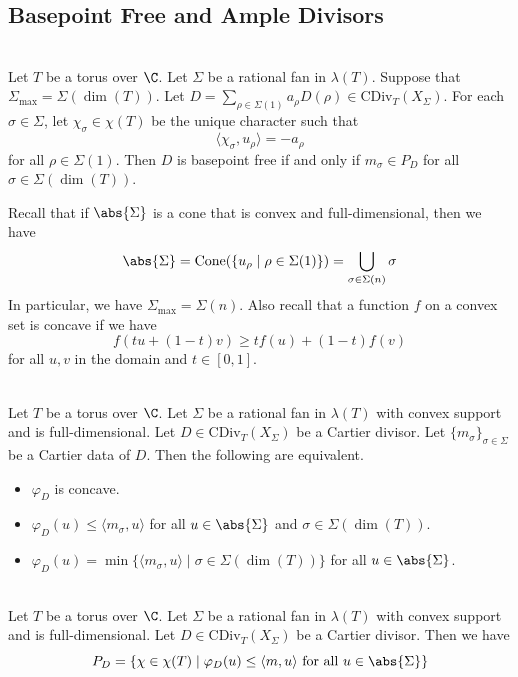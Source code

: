\documentclass[a4paper]{article}
\begin{document}
\subsection{Basepoint Free and Ample Divisors}
\begin{prp}{}{}\\
Let $T$ be a torus over $\C$. Let $\Sigma$ be a rational fan in $\lambda(T)$. Suppose that $\Sigma_\text{max}=\Sigma(\dim(T))$. Let $D=\sum_{\rho\in\Sigma(1)}a_\rho D(\rho)\in\text{CDiv}_T(X_\Sigma)$. For each $\sigma\in\Sigma$, let $\chi_\sigma\in\chi(T)$ be the unique character such that $$\langle\chi_\sigma,u_\rho\rangle=-a_\rho$$ for all $\rho\in\Sigma(1)$. Then $D$ is basepoint free if and only if $m_\sigma\in P_D$ for all $\sigma\in\Sigma(\dim(T))$. 
\end{prp}

Recall that if $\abs{\Sigma}$ is a cone that is convex and full-dimensional, then we have $$\abs{\Sigma}=\text{Cone}(\{u_\rho\;|\;\rho\in\Sigma(1)\})=\bigcup_{\sigma\in\Sigma(n)}\sigma$$ In particular, we have $\Sigma_\text{max}=\Sigma(n)$. Also recall that a function $f$ on a convex set is concave if we have $$f(tu+(1-t)v)\geq tf(u)+(1-t)f(v)$$ for all $u,v$ in the domain and $t\in[0,1]$. 

\begin{lmm}{}{}\\
Let $T$ be a torus over $\C$. Let $\Sigma$ be a rational fan in $\lambda(T)$ with convex support and is full-dimensional. Let $D\in\text{CDiv}_T(X_\Sigma)$ be a Cartier divisor. Let $\{m_\sigma\}_{\sigma\in\Sigma}$ be a Cartier data of $D$. Then the following are equivalent. 
\begin{itemize}
\item $\varphi_D$ is concave. 
\item $\varphi_D(u)\leq\langle m_\sigma,u\rangle$ for all $u\in\abs{\Sigma}$ and $\sigma\in\Sigma(\dim(T))$. 
\item $\varphi_D(u)=\min\{\langle m_\sigma,u\rangle\;|\;\sigma\in\Sigma(\dim(T))\}$ for all $u\in\abs{\Sigma}$. 
\end{itemize}
\end{lmm}

\begin{lmm}{}{}\\
Let $T$ be a torus over $\C$. Let $\Sigma$ be a rational fan in $\lambda(T)$ with convex support and is full-dimensional. Let $D\in\text{CDiv}_T(X_\Sigma)$ be a Cartier divisor. Then we have $$P_D=\{\chi\in\chi(T)\;|\;\varphi_D(u)\leq\langle m,u\rangle\text{ for all }u\in\abs{\Sigma}\}$$
\end{lmm}
\end{document}
